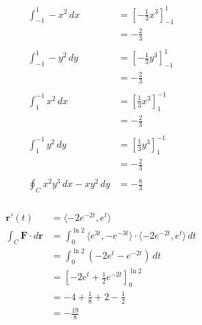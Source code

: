 \documentclass{article}
\begin{document}
\begin{align*}
  \int_{-1}^1 -x^2 \,dx             & = \left[ -\frac{1}{3} x^3 \right]_{-1}^1 \\
                                    & = -\frac{2}{3}                           \\ \\
  \int_{-1}^1 -y^2 \,dy             & = \left[ -\frac{1}{3} y^3 \right]_{-1}^1 \\
                                    & = -\frac{2}{3}                           \\ \\
  \int_1^{-1} x^2 \,dx              & = \left[ \frac{1}{3} x^3 \right]_1^{-1}  \\
                                    & = -\frac{2}{3}                           \\ \\
  \int_1^{-1} y^2 \,dy              & = \left[ \frac{1}{3} y^3 \right]_1^{-1}  \\
                                    & = -\frac{2}{3}                           \\ \\
  \oint_C x^2 y^3 \,dx - x y^2 \,dy & = -\frac{8}{3}
\end{align*}

\setcounter{subsubsection}{28}
\subsubsection{}

\begin{align*}
  \mathbf{r}'(t)                       & = \langle -2 e^{-2 t}, e^t \rangle                                                              \\
  \int_C \mathbf{F} \cdot d \mathbf{r} & = \int_0^{\ln 2} \langle e^{3 t}, -e^{-3 t} \rangle \cdot \langle -2 e^{-2 t}, e^t \rangle \,dt \\
                                       & = \int_0^{\ln 2} (-2 e^t - e^{-2 t}) \,dt                                                       \\
                                       & = \left[ -2 e^t + \frac{1}{2} e^{-2 t} \right]_0^{\ln 2}                                        \\
                                       & = -4 + \frac{1}{8} + 2 - \frac{1}{2}                                                            \\
                                       & = -\frac{19}{8}
\end{align*}
\end{document}
